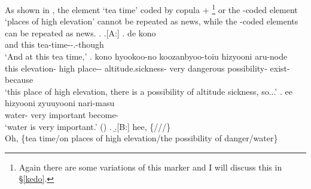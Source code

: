 %
As shown in \Next,
the element  `tea time' coded by copula + %
	\footnote{
	Again there are some variations of this marker
	and I will discuss this in \S \ref{kedo}.
	}
or the -coded element  `places of high elevation'
cannot be repeated as news,
while the -coded elements can be repeated as news.
%
\ex. \a.[A:] \ag. de kono  \\
		and this tea-time--.-though \\
		`And at this tea time,'
	\bg. kono hyookoo-no   koozanbyoo-toiu hizyooni   aru-node \\
		this elevation- high place-- altitude.sickness- very dangerous possibility- exist-because \\
		`this place of high elevation, there is a possibility of altitude sickness, so...'
	\bg. ee  hizyooni zyuuyooni nari-masu \\
		 water- very important become- \\
		`water is very important.'
		 \hfill{()}
	\z.
\b.[B:] hee, \{///\} \\
	Oh, \{tea time/on places of high elevation/the possibility of danger/water\}


%
%
%
%

